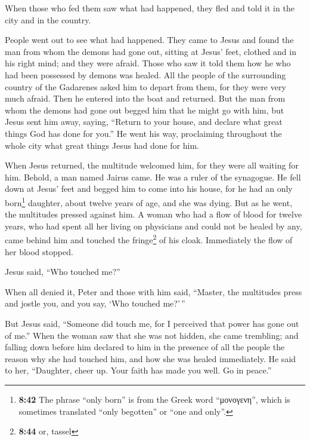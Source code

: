  When those who fed them saw what had happened, they fled
and told it in the city and in the country.

 People went out to see what had happened. They came to
Jesus and found the man from whom the demons had gone out, sitting at
Jesus' feet, clothed and in his right mind; and they were afraid.
 Those who saw it told them how he who had been possessed
by demons was healed.  All the people of the surrounding
country of the Gadarenes asked him to depart from them, for they were
very much afraid. Then he entered into the boat and returned.
 But the man from whom the demons had gone out begged him
that he might go with him, but Jesus sent him away, saying,
 ``Return to your house, and declare what great things
God has done for you.'' He went his way, proclaiming throughout the
whole city what great things Jesus had done for him.

 When Jesus returned, the multitude welcomed him, for
they were all waiting for him.  Behold, a man named
Jairus came. He was a ruler of the synagogue. He fell down at Jesus'
feet and begged him to come into his house,  for he had
an only born\footnote{\textbf{8:42} The phrase ``only born'' is from the
  Greek word ``μονογενη'', which is sometimes translated ``only
  begotten'' or ``one and only''.} daughter, about twelve years of age,
and she was dying. But as he went, the multitudes pressed against him.
 A woman who had a flow of blood for twelve years, who
had spent all her living on physicians and could not be healed by any,
 came behind him and touched the fringe\footnote{\textbf{8:44}
  or, tassel} of his cloak. Immediately the flow of her blood stopped.

 Jesus said, ``Who touched me?''

When all denied it, Peter and those with him said, ``Master, the
multitudes press and jostle you, and you say, `Who touched me?'\,''

 But Jesus said, ``Someone did touch me, for I perceived
that power has gone out of me.''  When the woman saw that
she was not hidden, she came trembling; and falling down before him
declared to him in the presence of all the people the reason why she had
touched him, and how she was healed immediately.  He said
to her, ``Daughter, cheer up. Your faith has made you well. Go in
peace.''


